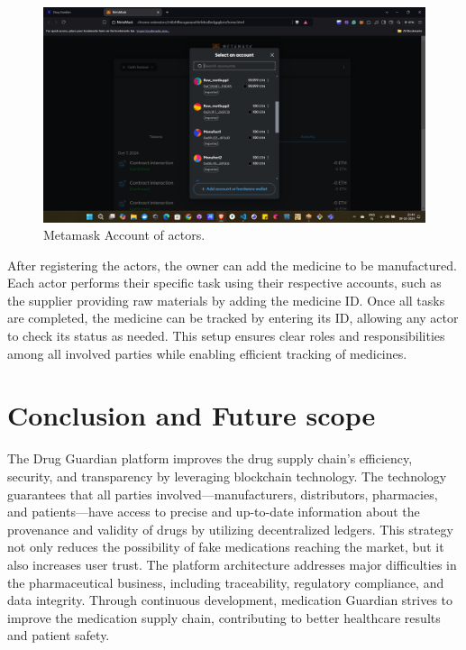 \documentclass[conference]{IEEEtran}
\begin{document}
\begin{figure}[h]
    \centering
    \includegraphics[width=1\linewidth]{assets/Fig 5.10.png}
    \caption{Metamask Account of actors.}
    \label{fig4}
\end{figure}



After registering the actors, the owner can add the medicine to be manufactured. Each actor performs their specific task using their respective accounts, such as the supplier providing raw materials by adding the medicine ID. Once all tasks are completed, the medicine can be tracked by entering its ID, allowing any actor to check its status as needed. This setup ensures clear roles and responsibilities among all involved parties while enabling efficient tracking of medicines.



\section{Conclusion and Future scope}
The Drug Guardian platform improves the drug supply chain's efficiency, security, and transparency by leveraging blockchain technology. The technology guarantees that all parties involved—manufacturers, distributors, pharmacies, and patients—have access to precise and up-to-date information about the provenance and validity of drugs by utilizing decentralized ledgers. This strategy not only reduces the possibility of fake medications reaching the market, but it also increases user trust. The platform architecture addresses major difficulties in the pharmaceutical business, including traceability, regulatory compliance, and data integrity. Through continuous development, medication Guardian strives to improve the medication supply chain, contributing to better healthcare results and patient safety.
\end{document}
